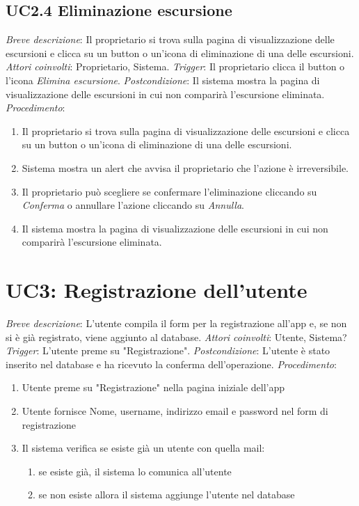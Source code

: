 \subsection{UC2.4 Eliminazione escursione}

\noindent \emph{Breve descrizione}: Il proprietario si trova sulla pagina di visualizzazione delle escursioni e clicca su un button o un'icona di eliminazione di una delle escursioni.\medbreak
\noindent \emph{Attori coinvolti}: Proprietario, Sistema.\medbreak
\noindent \emph{Trigger}: Il proprietario clicca il button o l'icona \textit{Elimina escursione}.\medbreak
\noindent \emph{Postcondizione}: Il sistema mostra la pagina di visualizzazione delle escursioni in cui non comparirà l'escursione eliminata.\medbreak
\noindent \emph{Procedimento}:

\begin{enumerate}
    \item Il proprietario si trova sulla pagina di visualizzazione delle escursioni e clicca su un button o un'icona di eliminazione di una delle escursioni.
    \item Sistema mostra un alert che avvisa il proprietario che l'azione è irreversibile.
    \item Il proprietario può scegliere se confermare l'eliminazione cliccando su \textit{Conferma} o annullare l'azione cliccando su \textit{Annulla}.
    \item Il sistema mostra la pagina di visualizzazione delle escursioni in cui non comparirà l'escursione eliminata.
\end{enumerate}

\section{UC3: Registrazione dell'utente}
\noindent \emph{Breve descrizione}: L'utente compila il form per la registrazione all'app e, se non si è già registrato, viene aggiunto al database.\medbreak
\noindent \emph{Attori coinvolti}: Utente, Sistema?\medbreak
\noindent \emph{Trigger}: L'utente preme su "Registrazione".\medbreak
\noindent \emph{Postcondizione}: L'utente è stato inserito nel database e ha ricevuto la conferma dell'operazione.\medbreak
\noindent \emph{Procedimento}:
\begin{enumerate}
    \item Utente preme su "Registrazione" nella pagina iniziale dell'app
    \item Utente fornisce Nome, username, indirizzo email e password nel form di registrazione
    \item Il sistema verifica se esiste già un utente con quella mail:
          \begin{enumerate}
              \item se esiste già, il sistema lo comunica all'utente
              \item se non esiste allora il sistema aggiunge l'utente nel database
          \end{enumerate}
\end{enumerate}

